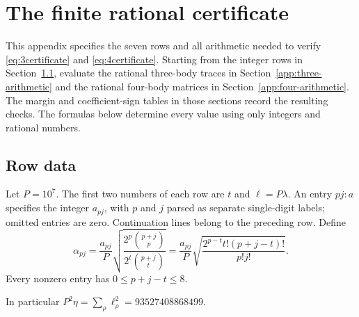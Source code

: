 \section{The finite rational certificate}
\label{app:certificate}
This appendix specifies the seven rows and all arithmetic needed to verify
\eqref{eq:3certificate} and \eqref{eq:4certificate}. Starting from the integer
rows in Section~\ref{app:rows}, evaluate the rational three-body traces in
Section~\ref{app:three-arithmetic} and the rational four-body matrices in
Section~\ref{app:four-arithmetic}. The margin and coefficient-sign tables in
those sections record the resulting checks. The formulas below determine
every value using only integers and rational numbers.

\subsection{Row data}
\label{app:rows}
Let $P=10^7$. The first two numbers of each row are $t$ and $\ell=P\lambda$. An entry $pj:a$ specifies the integer $a_{pj}$, with $p$ and $j$ parsed as separate single-digit labels; omitted entries are zero. Continuation lines belong to the preceding row. Define
\begin{equation}\label{eq:alphadata}
 \alpha_{pj}=\frac{a_{pj}}P
       \sqrt{\frac{2^p\binom{p+j}{p}}{2^t\binom{p+j}{t}}}
 =\frac{a_{pj}}P\sqrt{\frac{2^{p-t}t!(p+j-t)!}{p!j!}}.
\end{equation}
Every nonzero entry has $0\le p+j-t\le8$.
\par\noindent\begin{minipage}{\linewidth}

\end{minipage}\par
\smallskip
\noindent In particular $P^2\eta=\sum_\rho\ell_\rho^2=93527408868499$.

